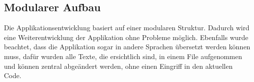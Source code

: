 \subsection{Modularer Aufbau}

Die Applikationsentwicklung basiert auf einer modularen Struktur.  Dadurch wird eine Weiterentwicklung der Applikation ohne Probleme möglich. Ebenfalls wurde beachtet, dass die Applikation sogar in andere Sprachen übersetzt werden können muss, dafür wurden alle Texte, die ersichtlich sind, in einem File aufgenommen und können zentral abgeändert werden, ohne einen Eingriff in den aktuellen Code.






